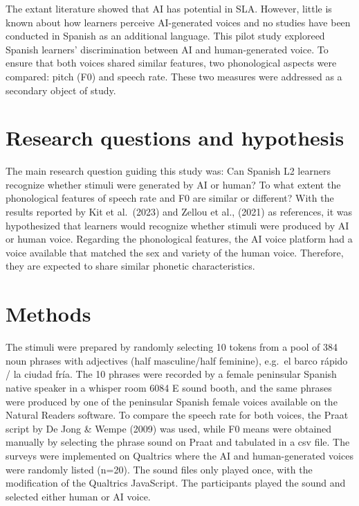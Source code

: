 \documentclass[
  a4paper,
  11pt,
  twocolumn]{article}
\begin{document}
The extant literature showed that AI has potential in SLA. However,
little is known about how learners perceive AI-generated voices and no
studies have been conducted in Spanish as an additional language. This
pilot study exploreed Spanish learners' discrimination between AI and
human-generated voice. To ensure that both voices shared similar
features, two phonological aspects were compared: pitch (F0) and speech
rate. These two measures were addressed as a secondary object of study.

\section{Research questions and hypothesis}

The main research question guiding this study was: Can Spanish L2
learners recognize whether stimuli were generated by AI or human? To
what extent the phonological features of speech rate and F0 are similar
or different? With the results reported by \cite{kit2023perception} Kit
et al.~(2023) and \cite{zellou2021influence} Zellou et al., (2021) as
references, it was hypothesized that learners would recognize whether
stimuli were produced by AI or human voice. Regarding the phonological
features, the AI voice platform had a voice available that matched the
sex and variety of the human voice. Therefore, they are expected to
share similar phonetic characteristics.

\section{Methods}

The stimuli were prepared by randomly selecting 10 tokens from a pool of
384 noun phrases with adjectives (half masculine/half feminine), e.g.~el
barco rápido / la ciudad fría. The 10 phrases were recorded by a female
peninsular Spanish native speaker in a whisper room 6084 E sound booth,
and the same phrases were produced by one of the peninsular Spanish
female voices available on the Natural Readers software. To compare the
speech rate for both voices, the Praat script by \cite{de2009praat} De
Jong \& Wempe (2009) was used, while F0 means were obtained manually by
selecting the phrase sound on Praat and tabulated in a csv file. The
surveys were implemented on Qualtrics where the AI and human-generated
voices were randomly listed (n=20). The sound files only played once,
with the modification of the Qualtrics JavaScript. The participants
played the sound and selected either human or AI voice.
\end{document}
